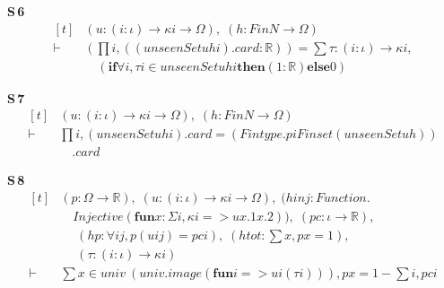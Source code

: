 \noindent\textbf{S\,6}\quad{}
{\footnotesize\[ \begin{aligned}[t]
&(\mathit{u} : (\mathit{i} : \iota ) \to \kappa \mathit{i} \to \Omega ),\; (\mathit{h} : \mathit{Fin} \mathit{N} \to \Omega )\\
\vdash\;&(\textstyle\prod \mathit{i}, ((\mathit{unseenSet} \mathit{u} \mathit{h} \mathit{i}).\mathit{card} : \mathbb{R} )) = \textstyle\sum \tau : (\mathit{i} : \iota ) \to \kappa \mathit{i},\\
&\quad (\mathbf{if} \forall \mathit{i}, \tau \mathit{i} \in \mathit{unseenSet} \mathit{u} \mathit{h} \mathit{i} \mathbf{then} (1:\mathbb{R} ) \mathbf{else} 0)
\end{aligned} \]}

\noindent\textbf{S\,7}\quad{}
{\footnotesize\[ \begin{aligned}[t]
&(\mathit{u} : (\mathit{i} : \iota ) \to \kappa \mathit{i} \to \Omega ),\; (\mathit{h} : \mathit{Fin} \mathit{N} \to \Omega )\\
\vdash\;&\textstyle\prod \mathit{i}, (\mathit{unseenSet} \mathit{u} \mathit{h} \mathit{i}).\mathit{card} = (\mathit{Fintype}.\mathit{piFinset} (\mathit{unseenSet} \mathit{u} \mathit{h}))\\
&\quad .\mathit{card}
\end{aligned} \]}

\noindent\textbf{S\,8}\quad{}
{\footnotesize\[ \begin{aligned}[t]
&(\mathit{p} : \Omega \to \mathbb{R} ),\; (\mathit{u} : (\mathit{i} : \iota ) \to \kappa \mathit{i} \to \Omega ),\; (\mathit{hinj} : \mathit{Function}.\\
&\quad \mathit{Injective} (\mathbf{fun} \mathit{x} : \Sigma \mathit{i}, \kappa \mathit{i} => \mathit{u} \mathit{x}.1 \mathit{x}.2)),\; (\mathit{pc} : \iota \to \mathbb{R} ),\\
&\quad \; (\mathit{hp} : \forall \mathit{i} \mathit{j}, \mathit{p} (\mathit{u} \mathit{i} \mathit{j}) = \mathit{pc} \mathit{i}),\; (\mathit{htot} : \textstyle\sum \mathit{x}, \mathit{p} \mathit{x} = 1),\\
&\quad \; (\tau : (\mathit{i} : \iota ) \to \kappa \mathit{i})\\
\vdash\;&\textstyle\sum \mathit{x} \in \mathit{univ} \ (\mathit{univ}.\mathit{image} (\mathbf{fun} \mathit{i} => \mathit{u} \mathit{i} (\tau \mathit{i}))), \mathit{p} \mathit{x} = 1 - \textstyle\sum \mathit{i}, \mathit{pc} \mathit{i}
\end{aligned} \]}



